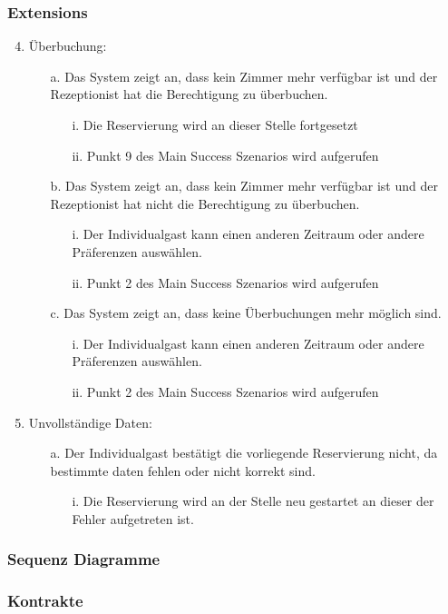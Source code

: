 \documentclass[./detailed_overview_usecases.tex]{subfiles}
\begin{document}
    \subsubsection*{Extensions}
    \begin{enumerate}
        \setcounter{enumi}{3}
        \item Überbuchung: \begin{itemize}
                       \item[a.] Das System zeigt an, dass kein Zimmer mehr verfügbar ist und der Rezeptionist hat die Berechtigung zu überbuchen.
                       \begin{itemize}
                           \item[i.] Die Reservierung wird an dieser Stelle fortgesetzt
                           \item[ii.] Punkt 9 des Main Success Szenarios wird aufgerufen
                       \end{itemize}
                       \item[b.] Das System zeigt an, dass kein Zimmer mehr verfügbar ist und der Rezeptionist hat nicht die Berechtigung zu überbuchen.
                       \begin{itemize}
                           \item[i.] Der Individualgast kann einen anderen Zeitraum oder andere Präferenzen auswählen.
                           \item[ii.] Punkt 2 des Main Success Szenarios wird aufgerufen
                       \end{itemize}
                       \item[c.] Das System zeigt an, dass keine Überbuchungen mehr möglich sind.
                       \begin{itemize}
                           \item[i.] Der Individualgast kann einen anderen Zeitraum oder andere Präferenzen auswählen.
                           \item[ii.] Punkt 2 des Main Success Szenarios wird aufgerufen
                       \end{itemize}
        \end{itemize}
        \setcounter{enumi}{7}
        \item Unvollständige Daten: \begin{itemize}
                               \item[a.] Der Individualgast bestätigt die vorliegende Reservierung nicht, da bestimmte daten fehlen oder nicht korrekt sind.
                               \begin{itemize}
                                   \item[i.] Die Reservierung wird an der Stelle neu gestartet an dieser der Fehler aufgetreten ist.
                               \end{itemize}
        \end{itemize}
    \end{enumerate}

    \subsubsection{Sequenz Diagramme}
    \subsubsection{Kontrakte}
\end{document}
